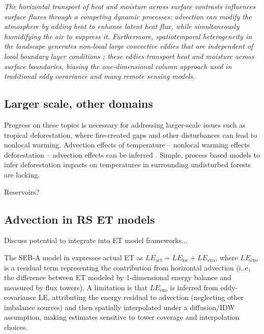 \documentclass{article}
\begin{document}
    \textit{The horizontal transport of heat and moisture across surface contrasts influences surface fluxes through a competing dynamic processes: advection can modify the atmosphere by adding heat to enhance latent heat flux, while simultaneously humidifying the air to suppress it. Furthermore, spatiotemporal heterogeneity in the landscape generates non-local large convective eddies that are independent of local boundary layer conditions \cite{wang2024advection}; these eddies transport heat and moisture across surface boundaries,  biasing the one-dimensional column approach used in traditional eddy covariance and many remote sensing models.}

    \subsection{Larger scale, other domains}

    Progress on these topics is necessary for addressing larger-scale issues such as tropical deforestation, where fire-created gaps and other disturbances can lead to nonlocal warming.
    Advection effects of temperature -- nonlocal warming effects deforestation -- advection effects can be inferred \cite{cohn2019forest, crompton2021deforestation}. 
    Simple, process based models to infer deforestation impacts on temperatures in surrounding undisturbed forests are lacking.

    Reservoirs?

    \subsection{Advection in  RS ET models}

    Discuss potential to integrate into ET model frameworks... 

    The SEB-A model in \citet{liu2016regional} expresses actual ET as $LE_{\mathrm{act}} = LE_{\mathrm{loc}} + LE_{\mathrm{exo}}$, where $LE_{\mathrm{exo}}$ is a  residual term representing the contribution from horizontal advection (i..e, the difference between ET modeled by 1-dimensional energy balance and measured by flux towers). 
    A  limitation is that $LE_{\mathrm{exo}}$ is inferred from eddy-covariance LE, attributing the energy residual to advection (neglecting other imbalance sources) and then spatially interpolated under a diffusion/IDW assumption, making estimates sensitive to tower coverage and interpolation choices.
\end{document}
